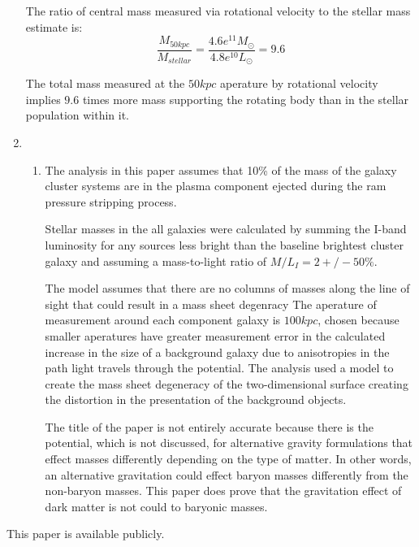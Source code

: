 \documentclass{paper}
\begin{document}
\begin{enumerate}
      The ratio of central mass measured via rotational velocity to the
      stellar mass estimate is:
      \[
        \frac{M_{50 \si{kpc}}}{M_{stellar}} = 
        \frac{4.6e^{11} M_{\odot}}{4.8e^{10} L_{\odot}} = 9.6
      \]

      The total mass measured at the \(50 \si{kpc}\) aperature by rotational
      velocity implies \(9.6\) times more mass supporting the rotating body
      than in the stellar population within it.

    \item
      \begin{enumerate}
        \item
          The analysis in this paper assumes that 10\% of the mass of the
          galaxy cluster systems are in the plasma component ejected during
          the ram pressure stripping process. 

          Stellar masses in the all galaxies were calculated by summing the
          I-band luminosity for any sources less bright than the baseline
          brightest cluster galaxy and assuming a mass-to-light ratio of
          \(M/L_I = 2 +/- 50\%\)\cite{Clowe_2006}.

          The model assumes that there are no columns of masses along the
          line of sight that could result in a mass sheet degenracy
          The aperature of measurement around each component galaxy is 
          \(100 kpc\), chosen because smaller aperatures have greater
          measurement error in the calculated increase in the size of a
          background galaxy due to anisotropies in the path light travels
          through the potential.  The analysis used a model to create the 
          mass sheet degeneracy of the two-dimensional surface creating the 
          distortion in the presentation of the background objects. 

          The title of the paper is not entirely accurate because there is
          the potential, which is not discussed, for alternative gravity
          formulations that effect masses differently depending on the
          type of matter. In other words, an alternative gravitation could
          effect baryon masses differently from the non-baryon masses. This
          paper does prove that the gravitation effect of dark matter is not
          could to baryonic masses.

      \end{enumerate}

\end{enumerate}

This paper is available publicly.\cite{Hayden_Cosmology_Source_Repo}

\pagebreak
\printbibliography
\end{document}
